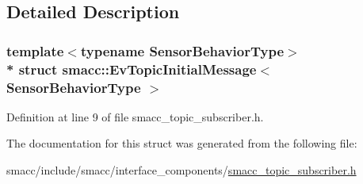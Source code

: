 \subsection{Detailed Description}
\subsubsection*{template$<$typename Sensor\+Behavior\+Type$>$\\*
struct smacc\+::\+Ev\+Topic\+Initial\+Message$<$ Sensor\+Behavior\+Type $>$}



Definition at line 9 of file smacc\+\_\+topic\+\_\+subscriber.\+h.



The documentation for this struct was generated from the following file\+:\begin{DoxyCompactItemize}
\item 
smacc/include/smacc/interface\+\_\+components/\hyperlink{smacc__topic__subscriber_8h}{smacc\+\_\+topic\+\_\+subscriber.\+h}\end{DoxyCompactItemize}

